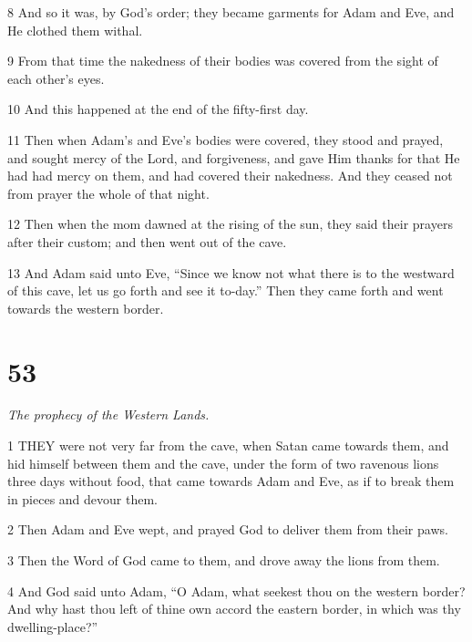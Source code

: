 \par 8 And so it was, by God's order; they became garments for Adam and Eve, and He clothed them withal.

\par 9 From that time the nakedness of their bodies was covered from the sight of each other's eyes.

\par 10 And this happened at the end of the fifty-first day.

\par 11 Then when Adam's and Eve's bodies were covered, they stood and prayed, and sought mercy of the Lord, and forgiveness, and gave Him thanks for that He had had mercy on them, and had covered their nakedness. And they ceased not from prayer the whole of that night.

\par 12 Then when the mom dawned at the rising of the sun, they said their prayers after their custom; and then went out of the cave.

\par 13 And Adam said unto Eve, “Since we know not what there is to the westward of this cave, let us go forth and see it to-day.” Then they came forth and went towards the western border.



\chapter{53}

\par \textit{The prophecy of the Western Lands.}

\par 1 THEY were not very far from the cave, when Satan came towards them, and hid himself between them and the cave, under the form of two ravenous lions three days without food, that came towards Adam and Eve, as if to break them in pieces and devour them.

\par 2 Then Adam and Eve wept, and prayed God to deliver them from their paws.

\par 3 Then the Word of God came to them, and drove away the lions from them.

\par 4 And God said unto Adam, “O Adam, what seekest thou on the western border? And why hast thou left of thine own accord the eastern border, in which was thy dwelling-place?”

